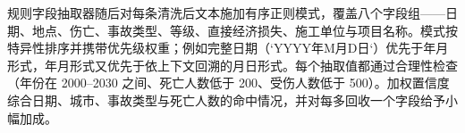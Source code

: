 \documentclass[11pt]{article}
\begin{document}
{\cjkfont 规\allowbreak 则\allowbreak 字\allowbreak 段\allowbreak 抽\allowbreak 取\allowbreak 器\allowbreak 随\allowbreak 后\allowbreak 对\allowbreak 每\allowbreak 条\allowbreak 清\allowbreak 洗\allowbreak 后\allowbreak 文\allowbreak 本\allowbreak 施\allowbreak 加\allowbreak 有\allowbreak 序\allowbreak 正\allowbreak 则\allowbreak 模\allowbreak 式\allowbreak ，\allowbreak 覆\allowbreak 盖\allowbreak 八\allowbreak 个\allowbreak 字\allowbreak 段\allowbreak 组}------{\cjkfont 日\allowbreak 期\allowbreak 、\allowbreak 地\allowbreak 点\allowbreak 、\allowbreak 伤\allowbreak 亡\allowbreak 、\allowbreak 事\allowbreak 故\allowbreak 类\allowbreak 型\allowbreak 、\allowbreak 等\allowbreak 级\allowbreak 、\allowbreak 直\allowbreak 接\allowbreak 经\allowbreak 济\allowbreak 损\allowbreak 失\allowbreak 、\allowbreak 施\allowbreak 工\allowbreak 单\allowbreak 位\allowbreak 与\allowbreak 项\allowbreak 目\allowbreak 名\allowbreak 称\allowbreak 。\allowbreak 模\allowbreak 式\allowbreak 按\allowbreak 特\allowbreak 异\allowbreak 性\allowbreak 排\allowbreak 序\allowbreak 并\allowbreak 携\allowbreak 带\allowbreak 优\allowbreak 先\allowbreak 级\allowbreak 权\allowbreak 重\allowbreak ；\allowbreak 例\allowbreak 如\allowbreak 完\allowbreak 整\allowbreak 日\allowbreak 期\allowbreak （}`YYYY{\cjkfont 年}M{\cjkfont 月}D{\cjkfont 日}`{\cjkfont ）\allowbreak 优\allowbreak 先\allowbreak 于\allowbreak 年\allowbreak 月\allowbreak 形\allowbreak 式\allowbreak ，\allowbreak 年\allowbreak 月\allowbreak 形\allowbreak 式\allowbreak 又\allowbreak 优\allowbreak 先\allowbreak 于\allowbreak 依\allowbreak 上\allowbreak 下\allowbreak 文\allowbreak 回\allowbreak 溯\allowbreak 的\allowbreak 月\allowbreak 日\allowbreak 形\allowbreak 式\allowbreak 。\allowbreak 每\allowbreak 个\allowbreak 抽\allowbreak 取\allowbreak 值\allowbreak 都\allowbreak 通\allowbreak 过\allowbreak 合\allowbreak 理\allowbreak 性\allowbreak 检\allowbreak 查\allowbreak （\allowbreak 年\allowbreak 份\allowbreak 在} 2000--2030 {\cjkfont 之\allowbreak 间\allowbreak 、\allowbreak 死\allowbreak 亡\allowbreak 人\allowbreak 数\allowbreak 低\allowbreak 于} 200{\cjkfont 、\allowbreak 受\allowbreak 伤\allowbreak 人\allowbreak 数\allowbreak 低\allowbreak 于} 500{\cjkfont ）\allowbreak 。\allowbreak 加\allowbreak 权\allowbreak 置\allowbreak 信\allowbreak 度\allowbreak 综\allowbreak 合\allowbreak 日\allowbreak 期\allowbreak 、\allowbreak 城\allowbreak 市\allowbreak 、\allowbreak 事\allowbreak 故\allowbreak 类\allowbreak 型\allowbreak 与\allowbreak 死\allowbreak 亡\allowbreak 人\allowbreak 数\allowbreak 的\allowbreak 命\allowbreak 中\allowbreak 情\allowbreak 况\allowbreak ，\allowbreak 并\allowbreak 对\allowbreak 每\allowbreak 多\allowbreak 回\allowbreak 收\allowbreak 一\allowbreak 个\allowbreak 字\allowbreak 段\allowbreak 给\allowbreak 予\allowbreak 小\allowbreak 幅\allowbreak 加\allowbreak 成\allowbreak 。}
\end{document}
